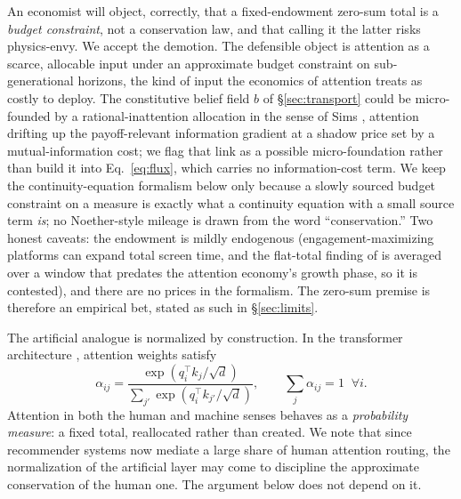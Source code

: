 \documentclass[11pt]{article}
\begin{document}
An economist will object, correctly, that a fixed-endowment zero-sum total is a \emph{budget constraint}, not a conservation law, and that calling it the latter risks physics-envy. We accept the demotion. The defensible object is attention as a scarce, allocable input under an approximate budget constraint on sub-generational horizons, the kind of input the economics of attention treats as costly to deploy. The constitutive belief field $b$ of \S\ref{sec:transport} could be micro-founded by a rational-inattention allocation in the sense of Sims \cite{sims2003}, attention drifting up the payoff-relevant information gradient at a shadow price set by a mutual-information cost; we flag that link as a possible micro-foundation rather than build it into Eq.~\eqref{eq:flux}, which carries no information-cost term. We keep the continuity-equation formalism below only because a slowly sourced budget constraint on a measure is exactly what a continuity equation with a small source term \emph{is}; no Noether-style mileage is drawn from the word ``conservation.'' Two honest caveats: the endowment is mildly endogenous (engagement-maximizing platforms can expand total screen time, and the flat-total finding of \cite{wu2008} is averaged over a window that predates the attention economy's growth phase, so it is contested), and there are no prices in the formalism. The zero-sum premise is therefore an empirical bet, stated as such in \S\ref{sec:limits}.

The artificial analogue is normalized by construction. In the transformer architecture \cite{vaswani2017}, attention weights satisfy
\begin{equation}
\alpha_{ij} = \frac{\exp(q_i^\top k_j/\sqrt{d})}{\sum_{j'} \exp(q_i^\top k_{j'}/\sqrt{d})},
\qquad \sum_j \alpha_{ij} = 1 \;\;\forall i .
\end{equation}
Attention in both the human and machine senses behaves as a \emph{probability measure}: a fixed total, reallocated rather than created. We note that since recommender systems now mediate a large share of human attention routing, the normalization of the artificial layer may come to discipline the approximate conservation of the human one. The argument below does not depend on it.
\end{document}
